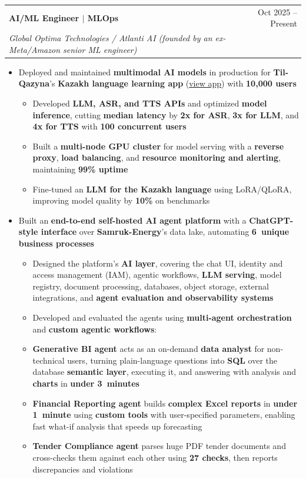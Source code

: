 \documentclass[letterpaper,11pt]{article}
\makeatletter
\newcommand{\resumeItem}[1]{
  \item\small{
    {#1 \vspace{-2pt}}
  }
}
\newcommand{\resumeSubheading}[4]{
  \vspace{-2pt}\item
    \begin{tabular*}{0.97\textwidth}[t]{l@{\extracolsep{\fill}}r}
      \textbf{#1} & #2 \\
      \textit{\small#3} & \textit{\small #4} \\
    \end{tabular*}\vspace{-7pt}
}
\newcommand{\resumeItemListStart}{\begin{itemize}}
\newcommand{\resumeItemListEnd}{\end{itemize}\vspace{-5pt}}
\newcommand{\resumeSubItemListStart}{\begin{itemize}[label={$\vcenter{\hbox{\tiny$\circ$}}$}, topsep=0pt, partopsep=0pt]}
\newcommand{\resumeSubItemListEnd}{\end{itemize}}
\makeatother
\begin{document}
    \resumeSubheading
      {AI/ML Engineer $|$ MLOps}{Oct 2025 -- Present}
      {Global Optima Technologies / Atlanti AI (founded by an ex-Meta/Amazon senior ML engineer)}{}
      \resumeItemListStart
        \resumeItem{Deployed and maintained \textbf{multimodal AI models} in production for \textbf{Til-Qazyna}'s \textbf{Kazakh language learning app} (\href{https://itutor.tilqazyna.kz/}{\underline{view app}}) with \textbf{10,000 users}}
        \resumeSubItemListStart
          \resumeItem{Developed \textbf{LLM, ASR, and TTS APIs} and optimized \textbf{model inference}, cutting \textbf{median latency} by \textbf{2x for ASR}, \textbf{3x for LLM}, and \textbf{4x for TTS} with \textbf{100 concurrent users}}
          \resumeItem{Built a \textbf{multi-node GPU cluster} for model serving with a \textbf{reverse proxy}, \textbf{load balancing}, and \textbf{resource monitoring and alerting}, maintaining \textbf{99\% uptime}}
          \resumeItem{Fine-tuned an \textbf{LLM for the Kazakh language} using LoRA/QLoRA, improving model quality by \textbf{10\%} on benchmarks}
        \resumeSubItemListEnd
        \resumeItem{Built an \textbf{end-to-end self-hosted AI agent platform} with a \textbf{ChatGPT-style interface} over \textbf{Samruk-Energy}'s data lake, automating \textbf{6~unique business processes}}
        \resumeSubItemListStart
          \resumeItem{Designed the platform's \textbf{AI layer}, covering the chat UI, identity and access management (IAM), agentic workflows, \textbf{LLM serving}, model registry, document processing, databases, object storage, external integrations, and \textbf{agent evaluation and observability systems}}
          \resumeItem{Developed and evaluated the agents using \textbf{multi-agent orchestration} and \textbf{custom agentic workflows}:}
          \resumeItem{\textbf{Generative BI agent} acts as an on-demand \textbf{data analyst} for non-technical users, turning plain-language questions into \textbf{SQL} over the database \textbf{semantic layer}, executing it, and answering with analysis and \textbf{charts} in \textbf{under 3~minutes}}
          \resumeItem{\textbf{Financial Reporting agent} builds \textbf{complex Excel reports} in \textbf{under 1~minute} using \textbf{custom tools} with user-specified parameters, enabling fast what-if analysis that speeds up forecasting}
          \resumeItem{\textbf{Tender Compliance agent} parses huge PDF tender documents and cross-checks them against each other using \textbf{27 checks}, then reports discrepancies and violations}
        \resumeSubItemListEnd
      \resumeItemListEnd
\end{document}
